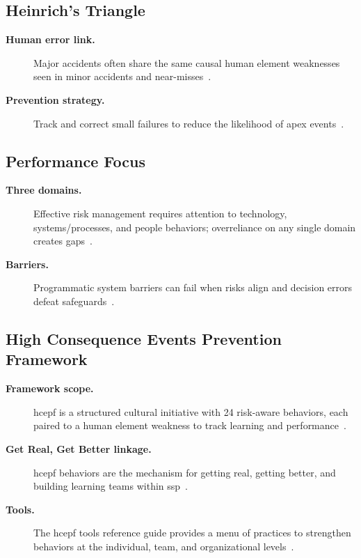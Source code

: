 \documentclass[../main.tex]{subfiles}
\begin{document}
\subsection{Heinrich's Triangle}
\begin{description}
  \item[\textbf{Human error link.}] Major accidents often share the same causal human element weaknesses seen in minor accidents and near-misses~\autocite{edo-5-1-10-hce-management-2025}.
  \item[\textbf{Prevention strategy.}] Track and correct small failures to reduce the likelihood of apex events~\autocite{edo-5-1-10-hce-management-2025}.
\end{description}

\subsection{Performance Focus}
\begin{description}
  \item[\textbf{Three domains.}] Effective risk management requires attention to technology, systems/processes, and people behaviors; overreliance on any single domain creates gaps~\autocite{edo-5-1-10-hce-management-2025}.
  \item[\textbf{Barriers.}] Programmatic system barriers can fail when risks align and decision errors defeat safeguards~\autocite{edo-5-1-10-hce-management-2025}.
\end{description}

\subsection{High Consequence Events Prevention Framework}
\begin{description}
  \item[\textbf{Framework scope.}] \ac{hcepf} is a structured cultural initiative with 24 risk-aware behaviors, each paired to a human element weakness to track learning and performance~\autocite{edo-5-1-10-hce-management-2025}.
  \item[\textbf{Get Real, Get Better linkage.}] \ac{hcepf} behaviors are the mechanism for getting real, getting better, and building learning teams within \ac{ssp}~\autocite{edo-5-1-10-hce-management-2025}.
  \item[\textbf{Tools.}] The \ac{hcepf} tools reference guide provides a menu of practices to strengthen behaviors at the individual, team, and organizational levels~\autocite{edo-5-1-10-hce-management-2025}.
\end{description}
\end{document}
